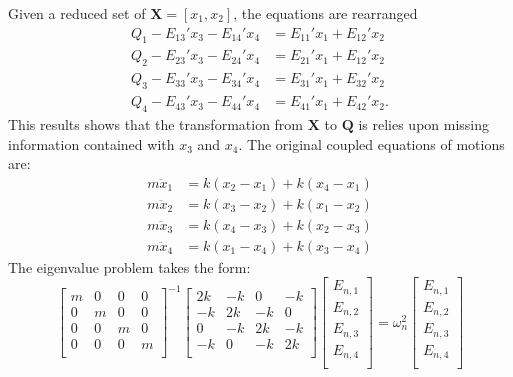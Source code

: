 Given a reduced set of $\bm{X}= [x_1,x_2]$, the equations are rearranged
\begin{equation}
\begin{split}
Q_1-E_{13}'x_3-E_{14}'x_4&= E_{11}'x_1 + E_{12}'x_2\\
Q_2-E_{23}'x_3-E_{24}'x_4&= E_{21}'x_1 + E_{12}'x_2\\
Q_3-E_{33}'x_3-E_{34}'x_4&= E_{31}'x_1 + E_{32}'x_2\\
Q_4-E_{43}'x_3-E_{44}'x_4&= E_{41}'x_1 + E_{42}'x_2.
\end{split}
\end{equation}
This results shows that the transformation from $\bm{X}$ to $\bm{Q}$ is relies upon missing information contained with $x_3$ and $x_4$. The original coupled equations of motions are:
\begin{align*}
m\ddot{x}_1&=k(x_2-x_1)+k(x_4-x_1)\\
m\ddot{x}_2&=k(x_3-x_2)+k(x_1-x_2)\\
m\ddot{x}_3&=k(x_4-x_3)+k(x_2-x_3)\\
m\ddot{x}_4&=k(x_1-x_4)+k(x_3-x_4)
\end{align*}
The eigenvalue problem takes the form:
\[
\begin{bmatrix}
   m & 0 & 0 & 0 \\
   0 & m & 0 & 0 \\
   0 & 0 & m & 0 \\
   0 & 0 & 0 & m \\
\end{bmatrix}^{-1}
\begin{bmatrix}
   2k & -k & 0 & -k \\
   -k & 2k & -k & 0 \\
   0 & -k & 2k & -k \\
   -k & 0 & -k & 2k \\
\end{bmatrix}
\begin{bmatrix}
   E_{n,1} \\
   E_{n,2} \\
   E_{n,3} \\
   E_{n,4} \\
\end{bmatrix}
=\omega^2_n
\begin{bmatrix}
   E_{n,1} \\
   E_{n,2} \\
   E_{n,3} \\
   E_{n,4} \\
\end{bmatrix}
\]
